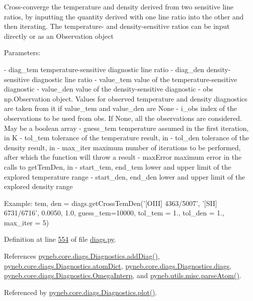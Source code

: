 \begin{DoxyVerb}Cross-converge the temperature and density derived from two sensitive line ratios, by inputting the quantity 
derived with one line ratio into the other and then iterating.
The temperature- and density-sensitive ratios can be input directly or as an Observation object
    
Parameters:
    
- diag_tem   temperature-sensitive diagnostic line ratio
- diag_den   density-sensitive diagnostic line ratio
- value_tem  value of the temperature-sensitive diagnostic
- value_den  value of the density-sensitive diagnostic
- obs        np.Observation object. Values for observed temperature and density diagnostics are
        taken from it if value_tem and value_den are None
- i_obs      index of the observations to be used from obs. 
        If None, all the observations are considered.
        May be a boolean array
- guess_tem  temperature assumed in the first iteration, in K
- tol_tem    tolerance of the temperature result, in %
- tol_den    tolerance of the density result, in %
- max_iter   maximum number of iterations to be performed, after which the function will throw a result
- maxError   maximum error in the calls to getTemDen, in %
- start_tem, end_tem  lower and upper limit of the explored temperature range 
- start_den, end_den  lower and upper limit of the explored density range 
    
Example:
    tem, den = diags.getCrossTemDen('[OIII] 4363/5007', '[SII] 6731/6716', 0.0050, 1.0, 
        guess_tem=10000, tol_tem = 1., tol_den = 1., max_iter = 5)\end{DoxyVerb}
 

Definition at line \hyperlink{diags_8py_source_l00554}{554} of file \hyperlink{diags_8py_source}{diags.\-py}.



References \hyperlink{diags_8py_source_l00246}{pyneb.\-core.\-diags.\-Diagnostics.\-add\-Diag()}, \hyperlink{diags_8py_source_l00407}{pyneb.\-core.\-diags.\-Diagnostics.\-atom\-Dict}, \hyperlink{diags_8py_source_l00173}{pyneb.\-core.\-diags.\-Diagnostics.\-diags}, \hyperlink{diags_8py_source_l00000}{pyneb.\-core.\-diags.\-Diagnostics.\-Omega\-Interp}, and \hyperlink{misc_8py_source_l00159}{pyneb.\-utils.\-misc.\-parse\-Atom()}.



Referenced by \hyperlink{diags_8py_source_l00421}{pyneb.\-core.\-diags.\-Diagnostics.\-plot()}.


